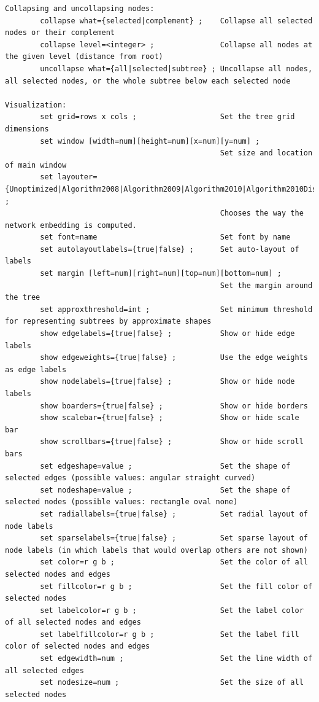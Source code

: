 \documentclass[11pt]{article}
\begin{document}
\begin{verbatim}
Collapsing and uncollapsing nodes:
        collapse what={selected|complement} ;    Collapse all selected nodes or their complement
        collapse level=<integer> ;               Collapse all nodes at the given level (distance from root)
        uncollapse what={all|selected|subtree} ; Uncollapse all nodes, all selected nodes, or the whole subtree below each selected node

Visualization:
        set grid=rows x cols ;                   Set the tree grid dimensions
        set window [width=num][height=num][x=num][y=num] ;    
                                                 Set size and location of main window
        set layouter={Unoptimized|Algorithm2008|Algorithm2009|Algorithm2010|Algorithm2010Dist|AlgorithmLSA} ; 
                                                 Chooses the way the network embedding is computed.
        set font=name                            Set font by name
        set autolayoutlabels={true|false} ;      Set auto-layout of labels
        set margin [left=num][right=num][top=num][bottom=num] ; 
                                                 Set the margin around the tree
        set approxthreshold=int ;                Set minimum threshold for representing subtrees by approximate shapes
        show edgelabels={true|false} ;           Show or hide edge labels
        show edgeweights={true|false} ;          Use the edge weights as edge labels
        show nodelabels={true|false} ;           Show or hide node labels
        show boarders={true|false} ;             Show or hide borders
        show scalebar={true|false} ;             Show or hide scale bar
        show scrollbars={true|false} ;           Show or hide scroll bars
        set edgeshape=value ;                    Set the shape of selected edges (possible values: angular straight curved)
        set nodeshape=value ;                    Set the shape of selected nodes (possible values: rectangle oval none)
        set radiallabels={true|false} ;          Set radial layout of node labels
        set sparselabels={true|false} ;          Set sparse layout of node labels (in which labels that would overlap others are not shown)
        set color=r g b ;                        Set the color of all selected nodes and edges
        set fillcolor=r g b ;                    Set the fill color of selected nodes
        set labelcolor=r g b ;                   Set the label color of all selected nodes and edges
        set labelfillcolor=r g b ;               Set the label fill color of selected nodes and edges
        set edgewidth=num ;                      Set the line width of all selected edges
        set nodesize=num ;                       Set the size of all selected nodes


\end{verbatim}
\end{document}
